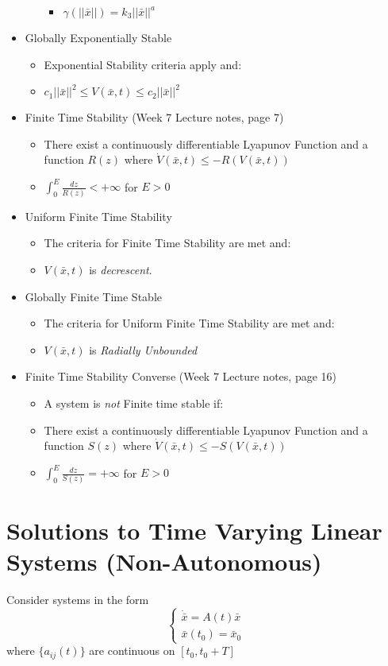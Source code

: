 \documentclass[12pt]{article}
\begin{document}
\begin{itemize}
\begin{itemize}
\begin{itemize}
		\item $\gamma(||\bar{x}||)=k_3||\bar{x}||^a$
		\end{itemize}
	\end{itemize}
\item Globally Exponentially Stable
	\begin{itemize}
	\item Exponential Stability criteria apply and:
	\item $c_1||\bar{x}||^2\leq V(\bar{x},t)\leq c_2||\bar{x}||^2$
	\end{itemize}
\item Finite Time Stability (Week 7 Lecture notes, page 7)
	\begin{itemize}
	\item There exist a continuously differentiable Lyapunov Function and a function $R(z)$ where $\dot{V}(\bar{x},t)\leq-R(V(\bar{x},t))$
	\item $\int_0^E\frac{dz}{R(z)}<+\infty$ for $E>0$
	\end{itemize}
\item Uniform Finite Time Stability
	\begin{itemize}
	\item The criteria for Finite Time Stability are met and: 
	\item $V(\bar{x},t)$ is {\em decrescent}.
	\end{itemize}
\item Globally Finite Time Stable 
	\begin{itemize}
	\item The criteria for Uniform Finite Time Stability are met and: 
	\item $V(\bar{x},t)$ is {\em Radially Unbounded}
	\end{itemize}
\item Finite Time Stability Converse (Week 7 Lecture notes, page 16)
	 \begin{itemize}
	 \item A system is {\em not} Finite time stable if:
	 \item There exist a continuously differentiable Lyapunov Function and a function $S(z)$ where $\dot{V}(\bar{x},t)\leq-S(V(\bar{x},t))$
	 \item $\int_0^E\frac{dz}{S(z)}=+\infty$ for $E>0$
	 \end{itemize}

\end{itemize}

\newpage
\section*{Solutions to Time Varying Linear Systems (Non-Autonomous)}
Consider systems in the form 
$$ 
\begin{cases}
\dot{\bar{x}}=A(t)\bar{x} \\
\bar{x}(t_0)=\bar{x}_0
\end{cases}
$$
where $\{a_{ij}(t)\}$ are continuous on $[t_0,t_0+T]$ \\
\end{document}
